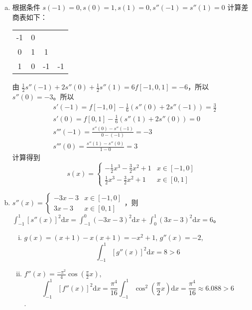 \documentclass[lang=cn,a4paper,newtx,bibend=bibtex]{elegantpaper}
\begin{document}
\begin{solution}
\begin{enumerate}[(a)]
\item 根据条件 $s(-1) = 0, s(0) = 1, s(1) = 0, s''(-1) = s''(1) = 0$ 计算差商表如下：
\begin{tabular}{c|ccc}
&&&\\
\hline
-1 & 0 & & \\
0 & 1 & 1 & \\
1 & 0 & -1 & -1
\end{tabular}
由 $\frac12 s''(-1) + 2s''(0) + \frac12 s''(1) = 6f[-1, 0, 1] = -6$，所以 $s''(0) = -3$。所以
\begin{equation*}
\begin{aligned}
&s'(-1) = f[-1, 0] - \frac16 (s''(0) + 2s''(-1)) = \frac32 \\
&s'(0) = f[0, 1] - \frac16(s''(1) + 2s''(0)) = 0 \\
&s'''(-1) = \frac{s''(0) - s''(-1)}{0 - (-1)} = -3 \\
&s'''(0) = \frac{s''(1) - s''(0)}{1 - 0} = 3
\end{aligned}
\end{equation*}
计算得到
\[
  s(x) = \begin{cases}-\frac12 x^3 - \frac32 x^2 +1 & x\in [-1, 0]\\ \frac12 x^3 - \frac32 x^2 + 1 & x \in [0, 1]\end{cases}
\]
\item $s''(x) = \begin{cases} -3x - 3 & x\in [-1, 0] \\ 3x - 3 & x\in [0, 1]\end{cases}$，则
$\int_{-1}^1 \left[s''(x)\right]^2\mathrm{d}x = \int_{-1}^0 (-3x-3)^2 \mathrm{d}x + \int_0^1 (3x-3)^2\mathrm{d}x = 6$。
\begin{enumerate}[(i)]
\item $g(x) = (x + 1) - x(x + 1) = -x^2 + 1$, $g''(x) = -2$, 
\[\int_{-1}^1 \left[g''(x)\right]^2 \mathrm{d}x = 8 > 6\]
\item $f''(x) = \frac{-\pi^2}{4}\cos{(\frac{\pi}2x)}$, 
\[\int_{-1}^1 \left[f''(x)\right]^2\mathrm{d}x = \frac{\pi^4}{16}\int_{-1}^1 \cos^2(\frac{\pi}2x)\mathrm{d}x = \frac{\pi^4}{16} \approx 6.088 > 6\].
\end{enumerate}
\end{enumerate}
\end{solution}
\end{document}
